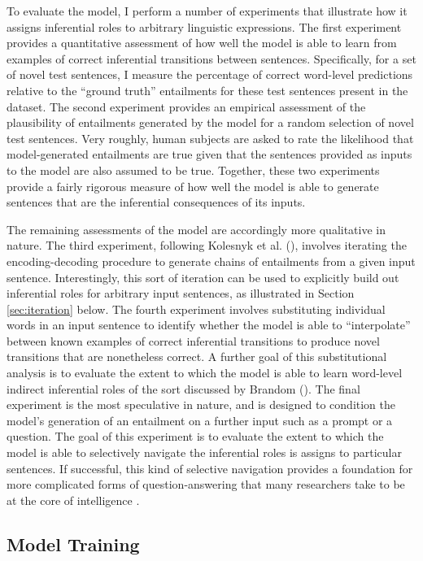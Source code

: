To evaluate the model, I perform a number of experiments that illustrate how it assigns inferential roles to arbitrary linguistic expressions. The first experiment provides a quantitative assessment of how well the model is able to learn from examples of correct inferential transitions between sentences. Specifically, for a set of novel test sentences, I measure the percentage of correct word-level predictions relative to the ``ground truth'' entailments for these test sentences present in the dataset. The second experiment provides an empirical assessment of the plausibility of entailments generated by the model for a random selection of novel test sentences. Very roughly, human subjects are asked to rate the likelihood that model-generated entailments are true given that the sentences provided as inputs to the model are also assumed to be true. Together, these two experiments provide a fairly rigorous measure of how well the model is able to generate sentences that are the inferential consequences of its inputs.

The remaining assessments of the model are accordingly more qualitative in nature. The third experiment, following Kolesnyk et al. (\citeyear{Kolesnyk:2016}), involves iterating the encoding-decoding procedure to generate chains of entailments from a given input sentence. Interestingly, this sort of iteration can be used to explicitly build out inferential roles for arbitrary input sentences, as illustrated in Section \ref{sec:iteration} below. The fourth experiment involves substituting individual words in an input sentence to identify whether the model is able to ``interpolate'' between known examples of correct inferential transitions to produce novel transitions that are nonetheless correct. A further goal of this substitutional analysis is to evaluate the extent to which the model is able to learn word-level indirect inferential roles of the sort discussed by Brandom (\citeyear{Brandom:1994}). The final experiment is the most speculative in nature, and is designed to condition the model's generation of an entailment on a further input such as a prompt or a question. The goal of this experiment is to evaluate the extent to which the model is able to selectively navigate the inferential roles is assigns to particular sentences. If successful, this kind of selective navigation provides a foundation for more complicated forms of question-answering that many researchers take to be at the core of intelligence \citep{Weston:2015,Weston:2016}. 

\subsection{Model Training}

